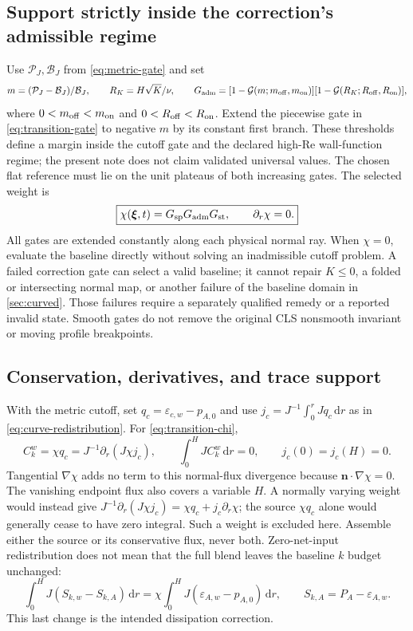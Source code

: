 \documentclass[11pt,a4paper]{article}
\numberwithin{equation}{section}
\newcommand{\dd}{\mathrm{d}}
\newcommand{\eps}{\varepsilon}
\newcommand{\EAw}{\eps_{A,w}}
\newcommand{\ECw}{\eps_{c,w}}
\begin{document}
\subsection{Support strictly inside the correction's admissible regime}
Use $\mathcal P_J,\mathcal B_J$ from \cref{eq:metric-gate} and set
\begin{equation}
 m=(\mathcal P_J-\mathcal B_J)/\mathcal B_J,\qquad
 R_K=H\sqrt K/\nu,\qquad
 G_{\rm adm}=[1-\mathcal G(m;m_{\rm off},m_{\rm on})]
 [1-\mathcal G(R_K;R_{\rm off},R_{\rm on})],
 \label{eq:transition-admissibility}
\end{equation}
where $0<m_{\rm off}<m_{\rm on}$ and
$0<R_{\rm off}<R_{\rm on}$. Extend the piecewise gate in
\cref{eq:transition-gate} to negative $m$ by its constant first branch.
These thresholds define a margin inside the cutoff gate and the
declared high-Re wall-function regime; the present note does not
claim validated universal values. The chosen flat reference must lie
on the unit plateaus of both increasing gates. The selected weight is
\begin{equation}
 \boxed{\chi(\bm\xi,t)=G_{\rm sp}G_{\rm adm}G_{\rm st},
 \qquad \partial_r\chi=0.}
 \label{eq:transition-chi}
\end{equation}
All gates are extended constantly along each physical normal ray.
When $\chi=0$, evaluate the baseline directly without solving an
inadmissible cutoff problem. A failed correction gate can select a
valid baseline; it cannot repair $K\le0$, a folded or intersecting
normal map, or another failure of the baseline domain in
\cref{sec:curved}. Those failures require a separately qualified
remedy or a reported invalid state. Smooth gates do not remove
the original CLS nonsmooth invariant or moving profile breakpoints.

\subsection{Conservation, derivatives, and trace support}
With the metric cutoff, set $q_c=\ECw-p_{A,0}$ and use
$j_c=J^{-1}\int_0^rJq_c\,\dd r$ as in
\cref{eq:curve-redistribution}. For \cref{eq:transition-chi},
\begin{equation}
 C_k^w=\chi q_c=J^{-1}\partial_r(J\chi j_c),\qquad
 \int_0^HJ C_k^w\,\dd r=0,
 \qquad j_c(0)=j_c(H)=0.
 \label{eq:transition-conservation}
\end{equation}
Tangential $\nabla\chi$ adds no term to this normal-flux divergence
because $\bm n\cdot\nabla\chi=0$. The vanishing endpoint flux
also covers a variable $H$. A normally varying weight would instead
give $J^{-1}\partial_r(J\chi j_c)=\chi q_c+j_c\partial_r\chi$;
the source $\chi q_c$ alone would generally cease to have zero
integral. Such a weight is excluded here. Assemble either the source
or its conservative flux, never both. Zero-net-input redistribution
does not mean that the full blend leaves the baseline $k$ budget
unchanged:
\begin{equation}
 \int_0^H J(S_{k,w}-S_{k,A})\,\dd r
 =\chi\int_0^H J(\EAw-p_{A,0})\,\dd r,
 \qquad S_{k,A}=P_A-\EAw.
 \label{eq:transition-full-budget}
\end{equation}
This last change is the intended dissipation correction.
\end{document}

